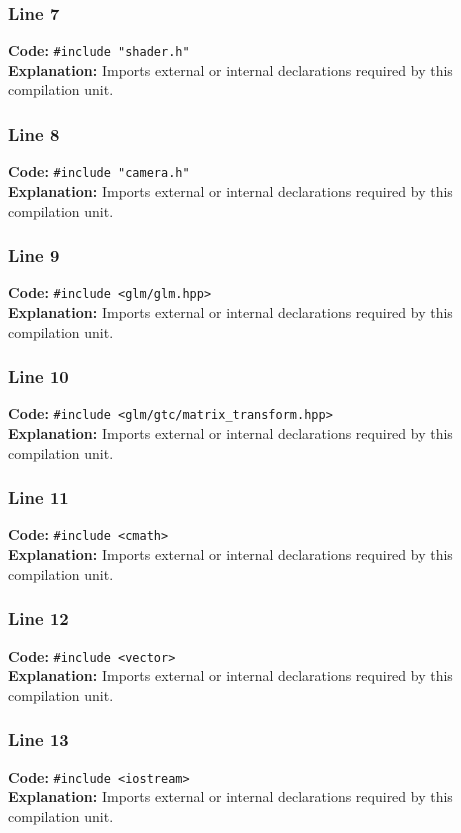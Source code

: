 \documentclass[11pt,a4paper]{article}
\begin{document}
\subsubsection*{Line 7}
\textbf{Code:} \verb|#include "shader.h"|\\
\textbf{Explanation:} Imports external or internal declarations required by this compilation unit.

\subsubsection*{Line 8}
\textbf{Code:} \verb|#include "camera.h"|\\
\textbf{Explanation:} Imports external or internal declarations required by this compilation unit.

\subsubsection*{Line 9}
\textbf{Code:} \verb|#include <glm/glm.hpp>|\\
\textbf{Explanation:} Imports external or internal declarations required by this compilation unit.

\subsubsection*{Line 10}
\textbf{Code:} \verb|#include <glm/gtc/matrix_transform.hpp>|\\
\textbf{Explanation:} Imports external or internal declarations required by this compilation unit.

\subsubsection*{Line 11}
\textbf{Code:} \verb|#include <cmath>|\\
\textbf{Explanation:} Imports external or internal declarations required by this compilation unit.

\subsubsection*{Line 12}
\textbf{Code:} \verb|#include <vector>|\\
\textbf{Explanation:} Imports external or internal declarations required by this compilation unit.

\subsubsection*{Line 13}
\textbf{Code:} \verb|#include <iostream>|\\
\textbf{Explanation:} Imports external or internal declarations required by this compilation unit.
\end{document}
